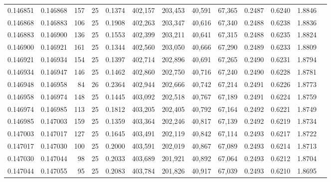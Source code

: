 \begin{tabular}{rrrrrrrrrrrrr}
0.146851 & 0.146868 &   157 &  25 &                                     0.1374 & 402,157 & 203,453 &  40,591 &  67,365 & 0.2487 & 0.6240 & 1.8846 \\
0.146868 & 0.146883 &   106 &  25 &                                     0.1908 & 402,263 & 203,347 &  40,616 &  67,340 & 0.2488 & 0.6238 & 1.8836 \\
0.146883 & 0.146900 &   136 &  25 &                                     0.1553 & 402,399 & 203,211 &  40,641 &  67,315 & 0.2488 & 0.6235 & 1.8824 \\
0.146900 & 0.146921 &   161 &  25 &                                     0.1344 & 402,560 & 203,050 &  40,666 &  67,290 & 0.2489 & 0.6233 & 1.8809 \\
0.146921 & 0.146934 &   154 &  25 &                                     0.1397 & 402,714 & 202,896 &  40,691 &  67,265 & 0.2490 & 0.6231 & 1.8794 \\
0.146934 & 0.146947 &   146 &  25 &                                     0.1462 & 402,860 & 202,750 &  40,716 &  67,240 & 0.2490 & 0.6228 & 1.8781 \\
0.146948 & 0.146958 &    84 &  26 &                                     0.2364 & 402,944 & 202,666 &  40,742 &  67,214 & 0.2491 & 0.6226 & 1.8773 \\
0.146958 & 0.146974 &   148 &  25 &                                     0.1445 & 403,092 & 202,518 &  40,767 &  67,189 & 0.2491 & 0.6224 & 1.8759 \\
0.146974 & 0.146985 &   113 &  25 &                                     0.1812 & 403,205 & 202,405 &  40,792 &  67,164 & 0.2492 & 0.6221 & 1.8749 \\
0.146985 & 0.147003 &   159 &  25 &                                     0.1359 & 403,364 & 202,246 &  40,817 &  67,139 & 0.2492 & 0.6219 & 1.8734 \\
0.147003 & 0.147017 &   127 &  25 &                                     0.1645 & 403,491 & 202,119 &  40,842 &  67,114 & 0.2493 & 0.6217 & 1.8722 \\
0.147017 & 0.147030 &   100 &  25 &                                     0.2000 & 403,591 & 202,019 &  40,867 &  67,089 & 0.2493 & 0.6214 & 1.8713 \\
0.147030 & 0.147044 &    98 &  25 &                                     0.2033 & 403,689 & 201,921 &  40,892 &  67,064 & 0.2493 & 0.6212 & 1.8704 \\
0.147044 & 0.147055 &    95 &  25 &                                     0.2083 & 403,784 & 201,826 &  40,917 &  67,039 & 0.2493 & 0.6210 & 1.8695 \\

\end{tabular}
